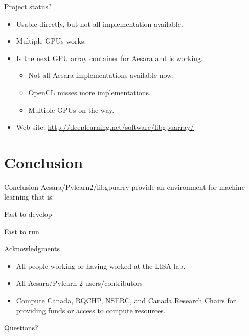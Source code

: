 \documentclass[utf8x,xcolor=pdftex,dvipsnames,table]{beamer}
\begin{document}
\begin{frame}{Project status?}
  \begin{itemize}
  \item Usable directly, but not all implementation available.
  \item Multiple GPUs works.
  \item Is the next GPU array container for Aesara and is working.
    \begin{itemize}
    \item Not all Aesara implementations available now.
    \item OpenCL misses more implementations.
    \item Multiple GPUs on the way.
    \end{itemize}
  \item Web site: \url{http://deeplearning.net/software/libgpuarray/}
  \end{itemize}
\end{frame}

\section{Conclusion}
\begin{frame}
  \tableofcontents[currentsection]
\end{frame}

\begin{frame}{Conclusion}
Aesara/Pylearn2/libgpuarry provide an environment for machine learning that is:
\begin{bf}Fast to develop\end{bf}\newline
\begin{bf}Fast to run\end{bf}\newline
\end{frame}

\begin{frame}{Acknowledgments}
\begin{itemize}
\item All people working or having worked at the LISA lab.
\item All Aesara/Pylearn 2 users/contributors
\item Compute Canada, RQCHP, NSERC, and Canada Research Chairs for providing funds or access to compute resources.
\end{itemize}
\end{frame}

\begin{frame}
\begin{center}
\Huge
Questions?
\end{center}
\end{frame}
\end{document}
